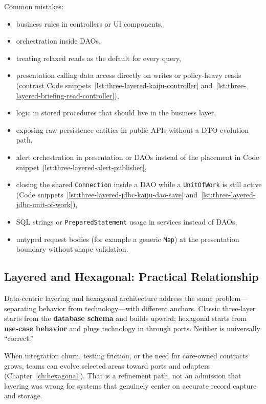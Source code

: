 Common mistakes:
\begin{itemize}
    \item business rules in controllers or UI components,
    \item orchestration inside DAOs,
    \item treating relaxed reads as the default for every query,
    \item presentation calling data access directly on writes or policy-heavy reads (contrast Code snippets~\ref{lst:three-layered-kaiju-controller} and~\ref{lst:three-layered-briefing-read-controller}),
    \item logic in stored procedures that should live in the business layer,
    \item exposing raw persistence entities in public APIs without a DTO evolution path,
    \item alert orchestration in presentation or DAOs instead of the placement in Code snippet~\ref{lst:three-layered-alert-publisher},
    \item closing the shared \texttt{Connection} inside a DAO while a \texttt{UnitOfWork} is still active (Code snippets~\ref{lst:three-layered-jdbc-kaiju-dao-save} and~\ref{lst:three-layered-jdbc-unit-of-work}),
    \item SQL strings or \texttt{PreparedStatement} usage in services instead of DAOs,
    \item untyped request bodies (for example a generic \texttt{Map}) at the presentation boundary without shape validation.
\end{itemize}

\subsection{Layered and Hexagonal: Practical Relationship}
\label{sec:three_layered_hexagonal_bridge}

Data-centric layering and hexagonal architecture address the same problem---separating behavior from technology---with different anchors. Classic three-layer starts from the \textbf{database schema} and builds upward; hexagonal starts from \textbf{use-case behavior} and plugs technology in through ports. Neither is universally ``correct.''

When integration churn, testing friction, or the need for core-owned contracts grows, teams can evolve selected areas toward ports and adapters (Chapter~\ref{ch:hexagonal}). That is a refinement path, not an admission that layering was wrong for systems that genuinely center on accurate record capture and storage.

